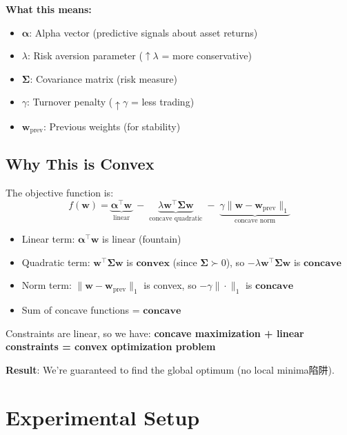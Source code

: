 \documentclass[a4paper,12pt]{article}
\begin{document}
\textbf{What this means:}
\begin{itemize}
    \item $\boldsymbol{\alpha}$: Alpha vector (predictive signals about asset returns)
    \item $\lambda$: Risk aversion parameter ($\uparrow \lambda$ = more conservative)
    \item $\boldsymbol{\Sigma}$: Covariance matrix (risk measure)
    \item $\gamma$: Turnover penalty ($\uparrow \gamma$ = less trading)
    \item $\mathbf{w}_{\text{prev}}$: Previous weights (for stability)
\end{itemize}

\subsection{Why This is Convex}

The objective function is:
\begin{equation}
f(\mathbf{w}) = \underbrace{\boldsymbol{\alpha}^\top \mathbf{w}}_{\text{linear}} \; - \; \underbrace{\lambda \mathbf{w}^\top \boldsymbol{\Sigma} \mathbf{w}}_{\text{concave quadratic}} \; - \; \underbrace{\gamma \|\mathbf{w} - \mathbf{w}_{\text{prev}}\|_1}_{\text{concave norm}}
\end{equation}

\begin{itemize}
    \item Linear term: $\boldsymbol{\alpha}^\top \mathbf{w}$ is linear (fountain)
    \item Quadratic term: $\mathbf{w}^\top \boldsymbol{\Sigma} \mathbf{w}$ is $\textbf{convex}$ (since $\boldsymbol{\Sigma} \succ 0$), so $-\lambda \mathbf{w}^\top \boldsymbol{\Sigma} \mathbf{w}$ is $\textbf{concave}$
    \item Norm term: $\|\mathbf{w} - \mathbf{w}_{\text{prev}}\|_1$ is convex, so $-\gamma \|\cdot\|_1$ is $\textbf{concave}$
    \item Sum of concave functions = $\textbf{concave}$
\end{itemize}

Constraints are linear, so we have: \textbf{concave maximization + linear constraints = convex optimization problem}

\textbf{Result}: We're guaranteed to find the global optimum (no local minima陷阱).

\section{Experimental Setup}
\end{document}
